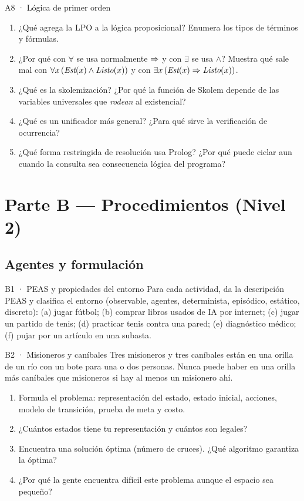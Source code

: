 \begin{ejercicio}{A8 · Lógica de primer orden }
\begin{enumerate}[label=\textbf{\arabic*.}]
\item ¿Qué agrega la LPO a la lógica proposicional? Enumera los tipos de términos y fórmulas.
\item ¿Por qué con $\forall$ se usa normalmente $\Rightarrow$ y con $\exists$ se usa $\wedge$? Muestra qué sale
mal con $\forall x\,(\textit{Est}(x)\wedge\textit{Listo}(x))$ y con $\exists x\,(\textit{Est}(x)\Rightarrow\textit{Listo}(x))$.
\item ¿Qué es la skolemización? ¿Por qué la función de Skolem depende de las variables
universales que \emph{rodean} al existencial?
\item ¿Qué es un unificador más general? ¿Para qué sirve la verificación de ocurrencia?
\item ¿Qué forma restringida de resolución usa Prolog? ¿Por qué puede ciclar aun cuando la
consulta sea consecuencia lógica del programa?
\end{enumerate}
\end{ejercicio}

\newpage
\section{Parte B — Procedimientos (Nivel 2)}

\subsection{Agentes y formulación}

\begin{ejercicio}{B1 · PEAS y propiedades del entorno }
Para cada actividad, da la descripción PEAS y clasifica el entorno (observable, agentes,
determinista, episódico, estático, discreto):
(a) jugar fútbol; (b) comprar libros usados de IA por internet; (c) jugar un partido de tenis;
(d) practicar tenis contra una pared; (e) diagnóstico médico; (f) pujar por un artículo en una subasta.
\end{ejercicio}

\begin{ejercicio}{B2 · Misioneros y caníbales }
Tres misioneros y tres caníbales están en una orilla de un río con un bote para una o dos
personas. Nunca puede haber en una orilla más caníbales que misioneros si hay al menos un misionero ahí.
\begin{enumerate}[label=(\alph*)]
\item Formula el problema: representación del estado, estado inicial, acciones, modelo de transición,
prueba de meta y costo.
\item ¿Cuántos estados tiene tu representación y cuántos son legales?
\item Encuentra una solución óptima (número de cruces). ¿Qué algoritmo garantiza la óptima?
\item ¿Por qué la gente encuentra difícil este problema aunque el espacio sea pequeño?
\end{enumerate}
\end{ejercicio}

